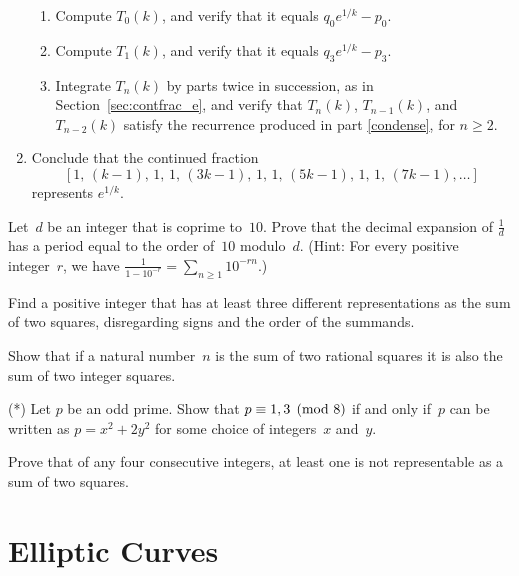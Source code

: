\begin{exercises}
\begin{enumerate}
\begin{enumerate}
\item
Compute $T_0(k)$, and verify that it equals $q_0e^{1/k}-p_0$.
\item
Compute $T_1(k)$, and verify that it equals $q_3e^{1/k}-p_3$.
\item
Integrate $T_n(k)$ by parts twice in succession, as in
Section~\ref{sec:contfrac_e}, and verify that $T_n(k)$, $T_{n-1}(k)$, and $T_{n-2}(k)$ satisfy the recurrence produced in part \ref{condense}, for $n\geq2$.
\end{enumerate}

\item
Conclude that the continued fraction
$$
  [1,\,(k-1),\,1,\,1,\,(3k-1),\,1,\,1,\,(5k-1),\,1,\,1,\,(7k-1),\ldots]
$$
 represents $e^{1/k}$.
\end{enumerate}


\item \label{ex:decexpord}
Let~$d$ be an integer that is coprime to~$10$.
Prove that the decimal expansion of $\frac{1}{d}$ has a period
equal to the order of~$10$ modulo~$d$.
(Hint: For every positive integer~$r$,  we have
$
  \frac{1}{1-10^{-r}} = \sum_{n\geq 1} 10^{-rn}.
$)


\item\label{ex:qf3} Find a positive integer that has at least three
  different representations as the sum of two squares, disregarding
  signs and the order of the summands.

\item\label{ex:qf4} Show that if a natural number~$n$ is the sum of two
  rational squares it is also the sum of two integer squares.

\item\label{ex:qf5}(*) Let $p$ be an odd prime.  Show that $p\equiv
  1,3\pmod{8}$ if and only if~$p$ can be written as $p=x^2 + 2y^2$ for
  some choice of integers~$x$ and~$y$.

\item\label{ex:qf7} Prove that of any four consecutive integers, at
  least one is not representable as a sum of two squares.

\end{exercises}



\chapter{Elliptic Curves}\label{ch:ec}


